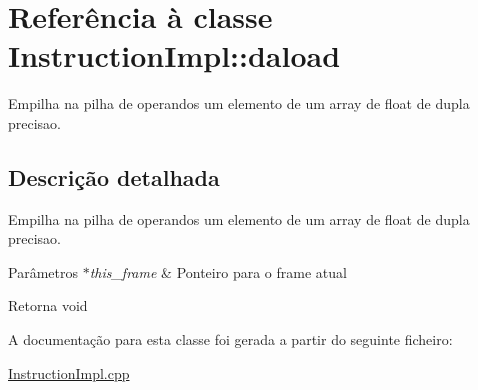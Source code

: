 \hypertarget{class_instruction_impl_1_1daload}{}\section{Referência à classe Instruction\+Impl\+:\+:daload}
\label{class_instruction_impl_1_1daload}


Empilha na pilha de operandos um elemento de um array de float de dupla precisao.  




\subsection{Descrição detalhada}
Empilha na pilha de operandos um elemento de um array de float de dupla precisao. 


\begin{DoxyParams}{Parâmetros}
{\em $\ast$this\+\_\+frame} & Ponteiro para o frame atual \\
\hline
\end{DoxyParams}
\begin{DoxyReturn}{Retorna}
void 
\end{DoxyReturn}


A documentação para esta classe foi gerada a partir do seguinte ficheiro\+:\begin{DoxyCompactItemize}
\item 
\hyperlink{_instruction_impl_8cpp}{Instruction\+Impl.\+cpp}\end{DoxyCompactItemize}
